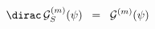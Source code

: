\begin{equation}
{\dirac}\, {\cal{G}}^{(m)}_S ( \psi ) \;\; =\;\; {\cal{G}}^{(m)} ( \psi
)
\label{eq:3.11}
\end{equation}

